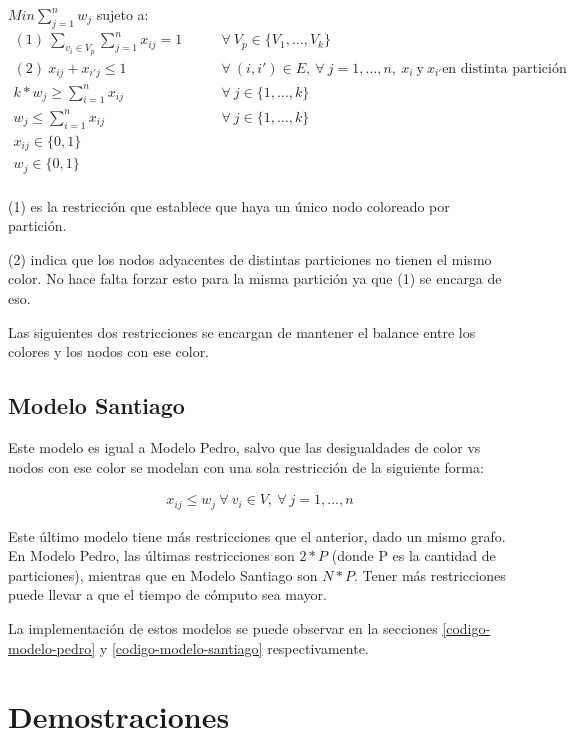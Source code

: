 \documentclass[a4paper, 10pt, twoside]{article}
\begin{document}
$Min \sum_{j=1}^{n} w_j$ sujeto a:
\begin{align*}
(1)\ \sum_{v_i \in V_p}\sum_{j=1}^{n} x_{ij} = 1 \qquad & \forall \ V_p \in \{V_1, \ldots, V_k\}\\
(2)\ x_{ij} + x_{i'j} \leq 1 \qquad & \forall \ (i,i') \in E, \ \forall \ j = 1, \ldots, n, \ x_i \ \text{y} \ x_{i'} \text{en distinta partición}\\
k * w_j \geq \sum_{i=1}^{n} x_{ij} \qquad & \forall \ j \in \{1, \ldots, k\}\\
w_j \leq \sum_{i=1}^{n} x_{ij} \qquad & \forall \ j \in \{1, \ldots, k\}\\
x_{ij} \in \{0,1\}\\
w_j \in \{0,1\}\\
\end{align*}

(1) es la restricción que establece que haya un único nodo coloreado por partición.

(2) indica que los nodos adyacentes de distintas particiones no tienen el mismo color. No hace falta forzar esto para la misma partición ya que (1) se encarga de eso.

Las siguientes dos restricciones se encargan de mantener el balance entre los colores y los nodos con ese color.

\subsection{Modelo Santiago}

Este modelo es igual a Modelo Pedro, salvo que las desigualdades de color vs nodos con ese color se modelan con una sola restricción de la siguiente forma:

\begin{align*}
x_{ij} \leq w_j \ \forall \ v_i \in V, \ \forall \ j=1,\ldots,n
\end{align*}

Este último modelo tiene más restricciones que el anterior, dado un mismo grafo. En Modelo Pedro, las últimas restricciones son $2 * P$ (donde P es la cantidad de particiones), mientras que en Modelo Santiago son $N * P$. Tener más restricciones puede llevar a que el tiempo de cómputo sea mayor.

La implementación de estos modelos se puede observar en la secciones \ref{codigo-modelo-pedro} y \ref{codigo-modelo-santiago} respectivamente.

\section{Demostraciones}
\end{document}
